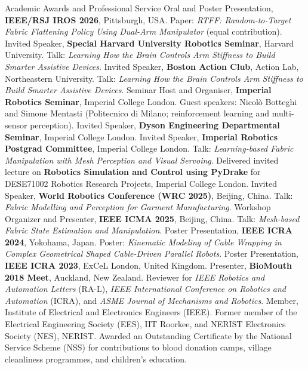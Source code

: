 \begin{rubric}{Academic Awards and Professional Service}
\entry*[27/09/26] Oral and Poster Presentation, \textbf{IEEE/RSJ IROS 2026}, Pittsburgh, USA. Paper: \textit{RTFF: Random-to-Target Fabric Flattening Policy Using Dual-Arm Manipulator} (equal contribution).
\entry*[24/09/26] Invited Speaker, \textbf{Special Harvard University Robotics Seminar}, Harvard University. Talk: \textit{Learning How the Brain Controls Arm Stiffness to Build Smarter Assistive Devices}.
\entry*[23/09/26] Invited Speaker, \textbf{Boston Action Club}, Action Lab, Northeastern University. Talk: \textit{Learning How the Brain Controls Arm Stiffness to Build Smarter Assistive Devices}.
\entry*[27/08/26] Seminar Host and Organiser, \textbf{Imperial Robotics Seminar}, Imperial College London. Guest speakers: Nicol\`o Botteghi and Simone Mentasti (Politecnico di Milano; reinforcement learning and multi-sensor perception).
\entry*[05/02/26] Invited Speaker, \textbf{Dyson Engineering Departmental Seminar}, Imperial College London.
\entry*[29/01/26] Invited Speaker, \textbf{Imperial Robotics Postgrad Committee}, Imperial College London. Talk: \textit{Learning-based Fabric Manipulation with Mesh Perception and Visual Servoing}.
\entry*[28/01/26] Delivered invited lecture on \textbf{Robotics Simulation and Control using PyDrake} for DESE71002 Robotics Research Projects, Imperial College London.
\entry*[08/08/25] Invited Speaker, \textbf{World Robotics Conference (WRC 2025)}, Beijing, China. Talk: \textit{Fabric Modelling and Perception for Garment Manufacturing}.
\entry*[03/08/25] Workshop Organizer and Presenter, \textbf{IEEE ICMA 2025}, Beijing, China. Talk: \textit{Mesh-based Fabric State Estimation and Manipulation}.
\entry*[13/05/24] Poster Presentation, \textbf{IEEE ICRA 2024}, Yokohama, Japan. Poster: \textit{Kinematic Modeling of Cable Wrapping in Complex Geometrical Shaped Cable-Driven Parallel Robots}.
\entry*[29/05/23] Poster Presentation, \textbf{IEEE ICRA 2023}, ExCeL London, United Kingdom.
\entry*[2018] Presenter, \textbf{BioMouth 2018 Meet}, Auckland, New Zealand.
\entry*[2021 -- Present] Reviewer for \textit{IEEE Robotics and Automation Letters} (RA-L), \textit{IEEE International Conference on Robotics and Automation} (ICRA), and \textit{ASME Journal of Mechanisms and Robotics}.
%
\entry*[2017 -- Present] Member, Institute of Electrical and Electronics Engineers (IEEE).
\entry*[2014] Former member of the Electrical Engineering Society (EES), IIT Roorkee, and NERIST Electronics Society (NES), NERIST.
\entry*[2006] Awarded an Outstanding Certificate by the National Service Scheme (NSS) for contributions to blood donation camps, village cleanliness programmes, and children's education.
\end{rubric}